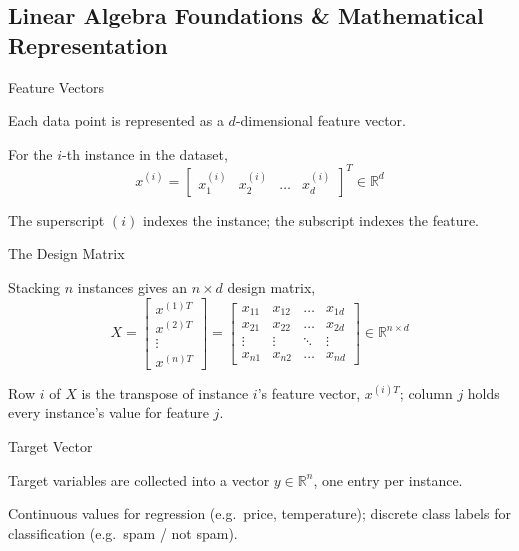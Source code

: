 
\subsection{Linear Algebra Foundations \& Mathematical Representation}


\begin{frame}{Feature Vectors}
    \begin{sitemize}
        \item Each data point is represented as a $d$-dimensional feature vector.
        \item For the $i$-th instance in the dataset,
        $$x^{(i)} = \begin{bmatrix} x^{(i)}_1 & x^{(i)}_2 & \dots & x^{(i)}_d \end{bmatrix}^T \in \mathbb{R}^d$$
        \item The superscript $(i)$ indexes the instance; the subscript indexes the feature.
    \end{sitemize}
\end{frame}


\begin{frame}{The Design Matrix}
    \begin{sitemize}
        \item Stacking $n$ instances gives an $n \times d$ design matrix,
        $$X = \begin{bmatrix} x^{(1)T} \\ x^{(2)T} \\ \vdots \\ x^{(n)T} \end{bmatrix} = \begin{bmatrix} x_{11} & x_{12} & \dots & x_{1d} \\ x_{21} & x_{22} & \dots & x_{2d} \\ \vdots & \vdots & \ddots & \vdots \\ x_{n1} & x_{n2} & \dots & x_{nd} \end{bmatrix} \in \mathbb{R}^{n \times d}$$
        \item Row $i$ of $X$ is the transpose of instance $i$'s feature vector, $x^{(i)T}$; column $j$ holds every instance's value for feature $j$.
    \end{sitemize}
\end{frame}


\begin{frame}{Target Vector}
    \begin{sitemize}
        \item Target variables are collected into a vector $y \in \mathbb{R}^n$, one entry per instance.
        \item Continuous values for regression (e.g.\ price, temperature); discrete class labels for classification (e.g.\ spam / not spam).
    \end{sitemize}
\end{frame}


